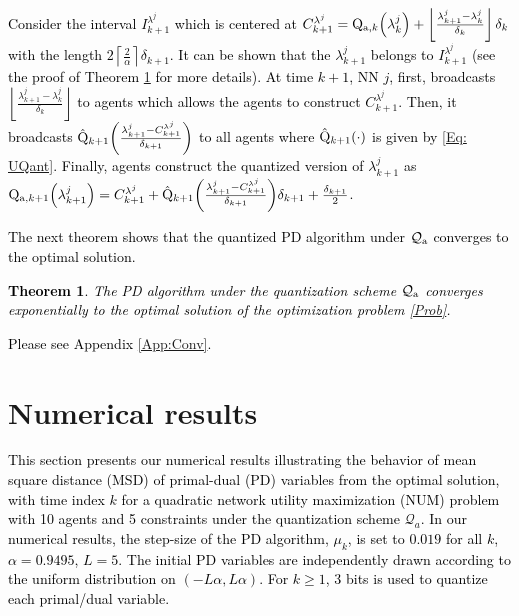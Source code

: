 \documentclass[10pt,twocolumn,twoside]{IEEEtran}
\newtheorem{theorem}{Theorem}
\begin{document}
\textcolor{black}{Consider the interval $I^{\lambda^j}_{k+1}$ which is centered at $C^{\lambda^j}_{k+1}={\rm Q}_{{\rm a},k}{\left({\lambda^j_{k}}\right)}+\left\lfloor \frac{\lambda^j_{k+1}-\lambda^j_{k}}{\delta_k}\right\rfloor\delta_k$ with the length  $2\left\lceil \frac{2}{\alpha}\right\rceil\delta_{k+1}$. It can be shown that the $\lambda^j_{k+1}$ belongs to $I^{\lambda^j}_{k+1}$ (see the proof of Theorem \ref{Theo: Conv} for more details). At time $k+1$, NN $j$, first, broadcasts $\left\lfloor \frac{\lambda^j_{k+1}-\lambda^j_{k}}{\delta_k}\right\rfloor$ to agents which allows the agents to construct $C^{\lambda^j}_{k+1}$. Then, it broadcasts  ${\rm \hat{Q}}_{k+1}{\left({\frac{\lambda^j_{k+1}-C^{\lambda^j}_{k+1}}{\delta_{k+1}}}\right)}$ to all agents where ${\rm \hat{Q}}_{k+1}{\left({\cdot}\right)}$ is given by \eqref{Eq: UQant}. Finally, agents construct the quantized version of $\lambda^j_{k+1}$ as ${\rm Q}_{{\rm a},k+1}{\left({\lambda^j_{k+1}}\right)}=C^{\lambda^j}_{k+1}+{\rm \hat{Q}}_{k+1}{\left({\frac{\lambda^j_{k+1}-C^{\lambda^j}_{k+1}}{\delta_{k+1}}}\right)}\delta_{k+1}+\frac{\delta_{k+1}}{2}$.}

\textcolor{black}{The next theorem shows that the quantized PD algorithm under $\mathcal{Q}_{\rm a}$ converges to the optimal solution.
\begin{theorem}\label{Theo: Conv}
The PD algorithm under the quantization scheme $\mathcal{Q}_{\rm a}$ converges  exponentially to the optimal solution of the optimization problem \eqref{Prob}. 
\end{theorem}
\begin{IEEEproof}
Please see Appendix \ref{App:Conv}.
\end{IEEEproof}}
\section{Numerical results}\label{Sec: NR}
\textcolor{black}{This section presents our numerical results illustrating the behavior of mean square distance (MSD) of primal-dual (PD) variables from the optimal solution, with time index $k$ for a quadratic network utility maximization (NUM) problem with 10 agents and 5 constraints under the quantization scheme $\mathcal{Q}_{a}$. 
In our numerical results, the step-size of the PD algorithm, $\mu_k$, is set to $0.019$ for all $k$, $\alpha=0.9495$, $L=5$. The initial PD variables are independently drawn according to the uniform distribution on $\left(-L\alpha,L\alpha\right)$. For $k\geq 1$,  3 bits is used to quantize each primal/dual variable.}
\end{document}
